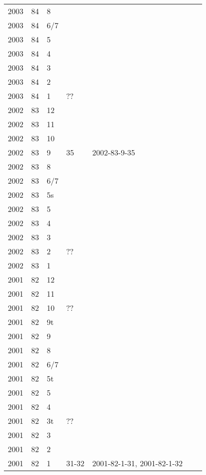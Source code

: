 \begin{longtable}{ |l|l|l|l|p{2.7cm}|l|p{2cm}| }
 2003 & 84 &     8 &         &  &  & \\
 2003 & 84 &   6/7 &         &  &  & \\
 2003 & 84 &     5 &         &  &  & \\
 2003 & 84 &     4 &         &  &  & \\
 2003 & 84 &     3 &         &  &  & \\
 2003 & 84 &     2 &         &  &  & \\
 2003 & 84 &     1 &     ??  &  &  & \\
 2002 & 83 &    12 &         &  &  & \\
 2002 & 83 &    11 &         &  &  & \\
 2002 & 83 &    10 &         &  &  & \\
 2002 & 83 &     9 &    35   & 2002-83-9-35  &  & \\
 2002 & 83 &     8 &         &  &  & \\
 2002 & 83 &   6/7 &         &  &  & \\
 2002 & 83 &    5s &         &  &  & \\
 2002 & 83 &     5 &         &  &  & \\
 2002 & 83 &     4 &         &  &  & \\
 2002 & 83 &     3 &         &  &  & \\
 2002 & 83 &     2 &    ??   &  &  & \\
 2002 & 83 &     1 &         &  &  & \\
 2001 & 82 &    12 &         &  &  & \\
 2001 & 82 &    11 &         &  &  & \\
 2001 & 82 &    10 &      ?? &  &  & \\
 2001 & 82 &    9t &         &  &  & \\
 2001 & 82 &     9 &         &  &  & \\
 2001 & 82 &     8 &         &  &  & \\
 2001 & 82 &   6/7 &         &  &  & \\
 2001 & 82 &    5t &         &  &  & \\
 2001 & 82 &     5 &         &  &  & \\
 2001 & 82 &     4 &         &  &  & \\
 2001 & 82 &    3t &     ??  &  &  & \\
 2001 & 82 &     3 &         &  &  & \\
 2001 & 82 &     2 &         &  &  & \\
 2001 & 82 &     1 &   31-32 & 2001-82-1-31, 2001-82-1-32 &  & \\

\end{longtable}
